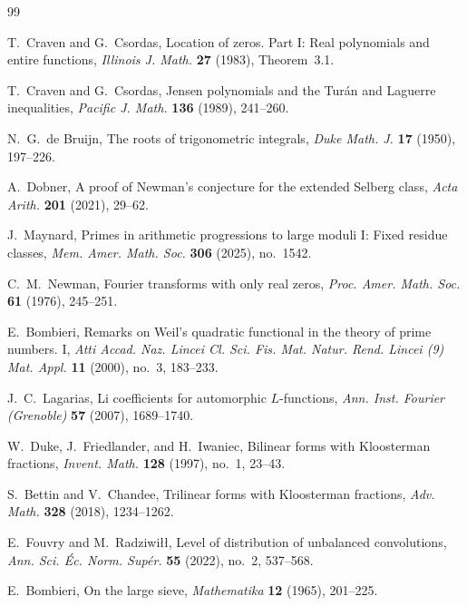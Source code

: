 \documentclass[11pt]{article}
\theoremstyle{definition}
\theoremstyle{remark}
\begin{document}
\small
\begin{thebibliography}{99}

T.~Craven and G.~Csordas,
\newblock Location of zeros. Part I: Real polynomials and entire functions,
\newblock \emph{Illinois J. Math.} \textbf{27} (1983), Theorem~3.1.

T.~Craven and G.~Csordas,
\newblock Jensen polynomials and the Tur\'an and Laguerre inequalities,
\newblock \emph{Pacific J. Math.} \textbf{136} (1989), 241--260.

N.~G.~de Bruijn,
\newblock The roots of trigonometric integrals,
\newblock \emph{Duke Math. J.} \textbf{17} (1950), 197--226.

A.~Dobner,
\newblock A proof of Newman's conjecture for the extended Selberg class,
\newblock \emph{Acta Arith.} \textbf{201} (2021), 29--62.

J.~Maynard,
\newblock Primes in arithmetic progressions to large moduli I: Fixed residue classes,
\newblock \emph{Mem. Amer. Math. Soc.} \textbf{306} (2025), no.~1542.

C.~M.~Newman,
\newblock Fourier transforms with only real zeros,
\newblock \emph{Proc. Amer. Math. Soc.} \textbf{61} (1976), 245--251.


E.~Bombieri,
\newblock Remarks on Weil's quadratic functional in the theory of prime numbers. I,
\newblock \emph{Atti Accad. Naz. Lincei Cl. Sci. Fis. Mat. Natur. Rend.
Lincei (9) Mat. Appl.} \textbf{11} (2000), no.~3, 183--233.

J.~C.~Lagarias,
\newblock Li coefficients for automorphic $L$-functions,
\newblock \emph{Ann. Inst. Fourier (Grenoble)} \textbf{57} (2007),
1689--1740.

W.~Duke, J.~Friedlander, and H.~Iwaniec,
\newblock Bilinear forms with Kloosterman fractions,
\newblock \emph{Invent. Math.} \textbf{128} (1997), no.~1, 23--43.

S.~Bettin and V.~Chandee,
\newblock Trilinear forms with Kloosterman fractions,
\newblock \emph{Adv. Math.} \textbf{328} (2018), 1234--1262.

E.~Fouvry and M.~Radziwi\l\l{},
\newblock Level of distribution of unbalanced convolutions,
\newblock \emph{Ann. Sci. \'Ec. Norm. Sup\'er.} \textbf{55} (2022),
no.~2, 537--568.

E.~Bombieri,
\newblock On the large sieve,
\newblock \emph{Mathematika} \textbf{12} (1965), 201--225.


\end{thebibliography}
\end{document}
